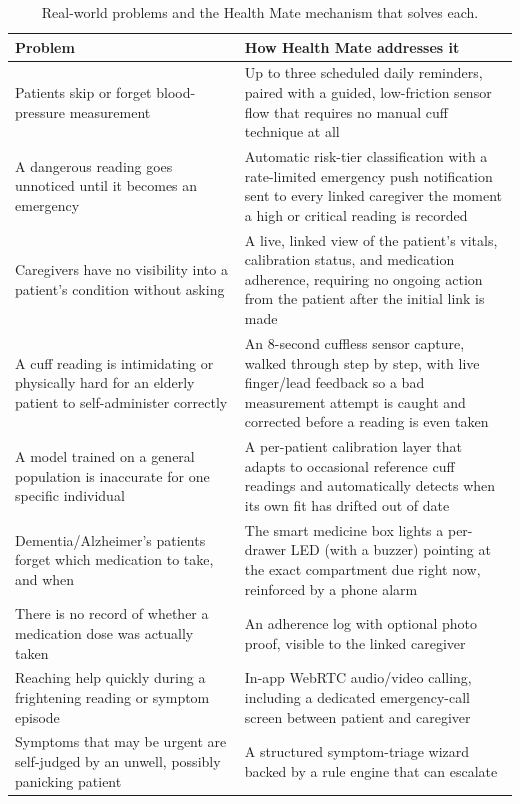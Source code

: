 \documentclass[12pt,a4paper]{report}
\begin{document}
\begin{table}[H]
\centering
\caption{Real-world problems and the Health Mate mechanism that solves each.}
\label{tab:problems}
\small
\begin{tabularx}{\linewidth}{@{}>{\raggedright\arraybackslash}p{4.7cm}Y@{}}
\toprule
\textbf{Problem} & \textbf{How Health Mate addresses it} \\
\midrule
Patients skip or forget blood-pressure measurement &
Up to three scheduled daily reminders, paired with a guided, low-friction
sensor flow that requires no manual cuff technique at all \\
A dangerous reading goes unnoticed until it becomes an emergency &
Automatic risk-tier classification with a rate-limited emergency push
notification sent to every linked caregiver the moment a high or critical
reading is recorded \\
Caregivers have no visibility into a patient's condition without asking &
A live, linked view of the patient's vitals, calibration status, and
medication adherence, requiring no ongoing action from the patient after the
initial link is made \\
A cuff reading is intimidating or physically hard for an elderly patient to
self-administer correctly &
An 8-second cuffless sensor capture, walked through step by step, with live
finger/lead feedback so a bad measurement attempt is caught and corrected
before a reading is even taken \\
A model trained on a general population is inaccurate for one specific
individual &
A per-patient calibration layer that adapts to occasional reference cuff
readings and automatically detects when its own fit has drifted out of date \\
Dementia/Alzheimer's patients forget which medication to take, and when &
The smart medicine box lights a per-drawer LED (with a buzzer) pointing at the
exact compartment due right now, reinforced by a phone alarm \\
There is no record of whether a medication dose was actually taken &
An adherence log with optional photo proof, visible to the linked caregiver \\
Reaching help quickly during a frightening reading or symptom episode &
In-app WebRTC audio/video calling, including a dedicated emergency-call screen
between patient and caregiver \\
Symptoms that may be urgent are self-judged by an unwell, possibly panicking
patient &
A structured symptom-triage wizard backed by a rule engine that can escalate

\end{tabularx}
\end{table}
\end{document}
